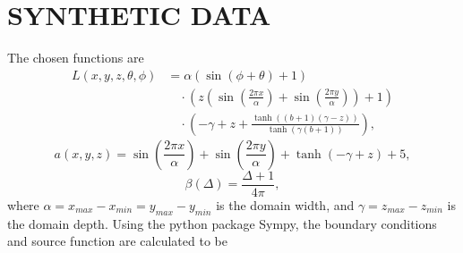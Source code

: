 \chapter{SYNTHETIC DATA}
\label{chap:synthetic_data}

The chosen functions are
\begin{align}
  L(x, y, z, \theta, \phi) &=
    \alpha \left(\sin{\left (\phi + \theta \right )} + 1\right) \nonumber\\
    &\quad\cdot \left(z \left(\sin{\left (\frac{2 \pi x}{\alpha} \right )} + \sin{\left (\frac{2 \pi y}{\alpha} \right )}\right) + 1\right) \nonumber\\
    &\quad\cdot \left(- \gamma + z + \frac{\tanh{\left (\left(b + 1\right) \left(\gamma - z\right) \right )}}{\tanh{\left (\gamma \left(b + 1\right) \right )}}\right),
  \label{eqn:mms_sol_expr}
\end{align}
\begin{equation}
  a(x, y, z) = \sin{\left (\frac{2 \pi x}{\alpha} \right )} + \sin{\left (\frac{2 \pi y}{\alpha} \right )} + \tanh{\left (- \gamma + z \right )} + 5,
  \label{eqn:mms_abs_expr}
\end{equation}
\begin{equation}
  \beta(\Delta) = \frac{\Delta + 1}{4 \pi},
  \label{eqn:mms_vsf_expr}
\end{equation}
where $\alpha=x_{max}-x_{min}=y_{max}-y_{min}$ is the domain width, and $\gamma=z_{max}-z_{min}$ is the domain depth.
Using the python package Sympy, the boundary conditions and source function are calculated to be
